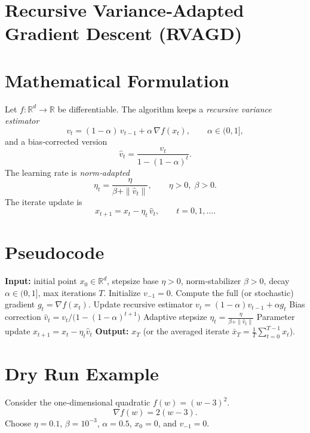 \documentclass{article}
\newcommand{\R}{\mathbb{R}}
\begin{document}
\section*{Recursive Variance‑Adapted Gradient Descent (RVAGD)}

\section*{Mathematical Formulation}
Let $f:\R^{d}\rightarrow\R$ be differentiable.  
The algorithm keeps a \emph{recursive variance estimator}
\[
v_{t}= (1-\alpha)\,v_{t-1}+ \alpha\,\nabla f(x_{t}),\qquad 
\alpha\in(0,1],
\tag{1}
\]
and a bias‑corrected version
\[
\hat v_{t}= \frac{v_{t}}{1-(1-\alpha)^{t}}.
\tag{2}
\]
The learning rate is \emph{norm‑adapted}
\[
\eta_{t}= \frac{\eta}{\beta+\|\hat v_{t}\|},\qquad 
\eta>0,\;\beta>0 .
\tag{3}
\]
The iterate update is
\[
x_{t+1}= x_{t}-\eta_{t}\,\hat v_{t},\qquad t=0,1,\dots .
\tag{4}
\]

\section*{Pseudocode}
\begin{algorithm}[H]
\caption{Recursive Variance‑Adapted Gradient Descent (RVAGD)}
\begin{algorithmic}[1]
\STATE \textbf{Input:} initial point $x_{0}\in\R^{d}$, stepsize base $\eta>0$, 
norm‑stabilizer $\beta>0$, decay $\alpha\in(0,1]$, max iterations $T$.
\STATE Initialize $v_{-1}=0$.
    \STATE Compute the full (or stochastic) gradient $g_{t}= \nabla f(x_{t})$.
    \STATE Update recursive estimator \;
          $v_{t}= (1-\alpha)v_{t-1}+ \alpha g_{t}$ \hfill{}
    \STATE Bias correction \;
          $\hat v_{t}= v_{t}/\bigl(1-(1-\alpha)^{t+1}\bigr)$ \hfill{}
    \STATE Adaptive stepsize \;
          $\eta_{t}= \displaystyle\frac{\eta}{\beta+\|\hat v_{t}\|}$ \hfill{}
    \STATE Parameter update \;
          $x_{t+1}= x_{t}-\eta_{t}\hat v_{t}$ \hfill{}
\ENDFOR
\STATE \textbf{Output:} $x_{T}$ (or the averaged iterate $\bar x_{T}=\frac1T\sum_{t=0}^{T-1}x_{t}$).
\end{algorithmic}
\end{algorithm}

\section*{Dry Run Example}
Consider the one‑dimensional quadratic $f(w)=(w-3)^{2}$.
\[
\nabla f(w)=2(w-3).
\]
Choose $\eta=0.1$, $\beta=10^{-3}$, $\alpha=0.5$, $x_{0}=0$, and $v_{-1}=0$.
\end{document}

